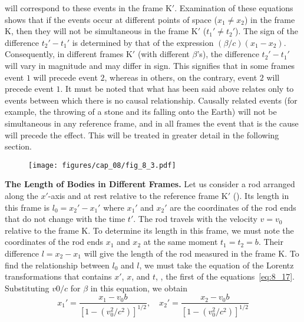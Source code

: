 \noindent
will correspond to these events in the frame K$'$. Examination of these equations shows that if the events occur at different points of space ($x_1\neq x_2$) in the frame K, then they will not be simultaneous in the frame K$'$ ($t_1'\neq t_2'$). The sign of the difference $t_2'-t_1'$ is determined by that of the expression $(\beta/c)(x_1-x_2)$. Consequently, in different frames K$'$ (with different $\beta$'s), the difference $t_2'-t_1'$ will vary in magnitude and may differ in sign. This signifies that in some frames event $1$ will precede event $2$, whereas in others, on the contrary, event $2$ will precede event $1$. It must be noted that what has been said above relates only to events between which there is no causal relationship. Causally related events (for example, the throwing of a stone and its falling onto the Earth) will not be simultaneous in any reference frame, and in all frames the event that is the cause will precede the effect. This will be treated in greater detail in the following section.

\begin{figure}[t]
	\begin{center}
		\texttt{[image: figures/cap\_08/fig\_8\_3.pdf]}
		\caption[]{}
		\label{fig:8_3}
	\end{center}
	\vspace{-0.8cm}
\end{figure}

\textbf{The Length of Bodies in Different Frames.} Let us consider a rod arranged along the $x'$-axis and at rest relative to the reference frame K$'$ (). Its length in this frame is $l_0=x_2'-x_1'$ where $x_1'$ and $x_2'$ are the coordinates of the rod ends that do not change with the time $t'$. The rod travels with the velocity $v=v_0$ relative to the frame K. To determine its length in this frame, we must note the coordinates of the rod ends $x_1$ and $x_2$ at the same moment $t_1=t_2=b$. Their difference $l=x_2-x_1$ will give the length of the rod measured in the frame K. To find the relationship between $l_0$ and $l$, we must take the equation of the Lorentz transformations that contains $x'$, $x$, and $t$, \ie, the first of the equations~\eqref{eq:8_17}. Substituting $v0/c$ for $\beta$ in this equation, we obtain 
\begin{equation*}
	x_1' = \frac{x_1 - v_0 b}{\left[1 - \left(v_0^2/c^2\right)\right]^{1/2}},\quad x_2' = \frac{x_2 - v_0 b}{\left[1 - \left(v_0^2/c^2\right)\right]^{1/2}}
\end{equation*}

